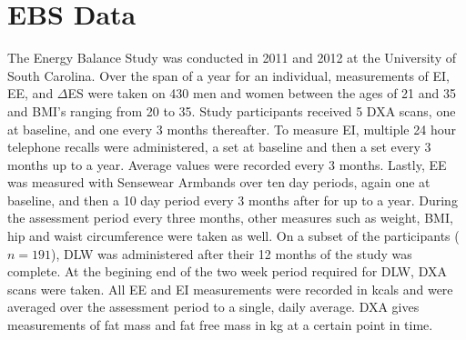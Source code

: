 \documentclass[11pt]{article}\usepackage[]{graphicx}\usepackage[]{color}
\begin{document}
% 
% 


\section{EBS Data}
The Energy Balance Study \cite{hand} was conducted in 2011 and 2012 at the University of South Carolina. Over the span of a year for an individual, measurements of EI, EE, and $\Delta$ES were taken on 430 men and women between the ages of 21 and 35 and BMI's ranging from 20 to 35. Study participants received 5 DXA scans, one at baseline, and one every 3 months thereafter. To measure EI, multiple 24 hour telephone recalls were administered, a set at baseline and then a set every 3 months up to a year. Average values were recorded every 3 months. Lastly, EE was measured with Sensewear Armbands over ten day periods, again one at baseline, and then a 10 day period every 3 months after for up to a year. During the assessment period every three months, other measures such as weight, BMI, hip and waist circumference were taken as well. On a subset of the participants ($n=191$), DLW was administered after their 12 months of the study was complete. At the begining end of the two week period required for DLW, DXA scans were taken. All EE and EI measurements were recorded in kcals and were averaged over the assessment period to a single, daily average. DXA gives measurements of fat mass and fat free mass in kg at a certain point in time. 
\end{document}
